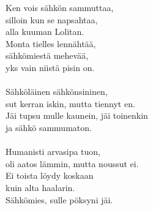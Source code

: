 
            Ken vois sähkön sammuttaa, \\
            silloin kun se napsahtaa, \\
            alla kuuman Lolitan. \\
            Monta tielles lennähtää, \\
            sähkömiestä mehevää, \\
            yks vain niistä pisin on. \\
\hspace{10mm} \\
            Sähköläinen sähkönsininen, \\
            sut kerran iskin, mutta tiennyt en.  \\
            Jäi tupsu mulle kaunein, jäi toinenkin \\
            ja sähkö sammumaton. \\
\hspace{10mm} \\
            Humanisti arvasipa tuon, \\
            oli aatos lämmin, mutta noussut ei. \\
            Ei toista löydy koskaan \\
            kuin alta haalarin. \\
            Sähkömies, sulle pöksyni jäi. \\

